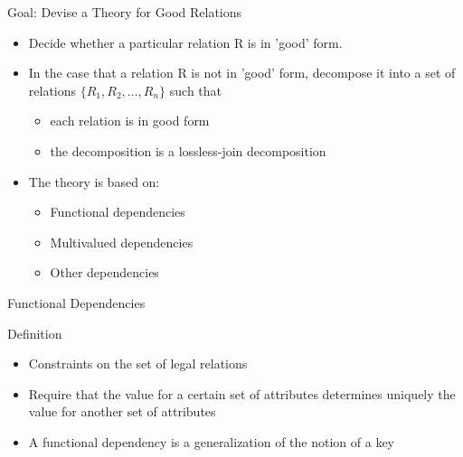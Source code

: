 \documentclass[aspectratio=169, xcolor=dvipsnames]{beamer}
\begin{document}
\begin{frame}{Goal: Devise a Theory for Good Relations}
    \begin{itemize}[<+->]
        \item Decide whether a particular relation R is in 'good' form.
        \item In the case that a relation R is not in 'good' form, decompose it into a set of relations $\{R_1, R_2, \dots, R_n\}$ such that
        \begin{itemize}
            \item[$\triangleright$] each relation is in good form
            \item[$\triangleright$] the decomposition is a lossless-join decomposition
        \end{itemize}
        \item The theory is based on:
        \begin{itemize}
            \item[$\triangleright$] Functional dependencies
            \item[$\triangleright$] Multivalued dependencies
            \item[$\triangleright$] Other dependencies
        \end{itemize}
    \end{itemize}
\end{frame}

\begin{frame}{Functional Dependencies}
    \begin{block}{Definition}
        \begin{itemize}[<+->]
            \item Constraints on the set of legal relations
            \item Require that the value for a certain set of attributes determines uniquely the value for another set of attributes
            \item A functional dependency is a generalization of the notion of a key
        \end{itemize}
    \end{block}
\end{frame}
\end{document}
